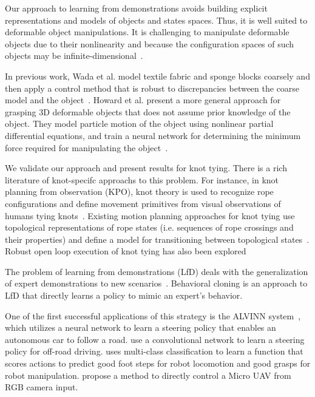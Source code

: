 Our approach to learning from demonstrations avoids building explicit representations
and models of objects and states spaces. Thus, it is well suited to deformable object 
manipulations. It is challenging to manipulate deformable objects due to their nonlinearity
and because the configuration spaces of such objects may be
infinite-dimensional~\cite{Lamiraux_IJRR2001}.

In previous work, Wada et al. model textile fabric and sponge blocks
coarsely and then apply a control method that is robust
to discrepancies between the coarse model and the
object~\cite{Wada_ArticMotion2000}. Howard et al. present a more
general approach for grasping 3D deformable objects
that does not assume prior knowledge of the object.
They model particle motion of the object using nonlinear partial differential
equations, and train a neural network for determining the minimum force
required for manipulating the object~\cite{Howard_AutRobots2000}.

We validate our approach and present results for knot tying. There is
a rich literature of knot-specifc approachs to this problem.
For instance, in knot planning from observation (KPO), knot theory is used
to recognize rope configurations and define
movement primitives from visual observations of humans tying
knots~\cite{Morita_ICRA2003, Takamatsu_TransRob2006}.
Existing motion planning approaches for knot tying use topological
representations of rope states (i.e. sequences of rope crossings and their
properties) and define a model for transitioning between topological
states~\cite{Moll_IEEERobot2006, Saha_ExpRobotics2008, Wakamatsu_IJRR2006}.
Robust open loop execution of knot tying has also been explored~\cite{Bell_PhD2010}

The problem of learning from demonstrations (LfD) deals with the generalization of expert demonstrations to 
new scenarios~\cite{Argall_2009, Schaal_1999}. Behavioral cloning is an approach to LfD that 
directly learns a policy to mimic an expert's behavior.

One of the first successful applications of this strategy is the ALVINN system~\cite{Pomerleau_NIPS1989}, which utilizes a 
neural network to learn a steering policy that enables an autonomous car to follow a road.
\cite{muller2005off} use a convolutional network to learn a steering policy for off-road driving.
\cite{Ratliff_Humanoids2007} uses multi-class classification to learn a function that scores actions 
to predict good foot steps for robot locomotion and good grasps for robot manipulation.
\cite{Ross_2013} propose a method to directly control a Micro UAV from RGB camera input.


